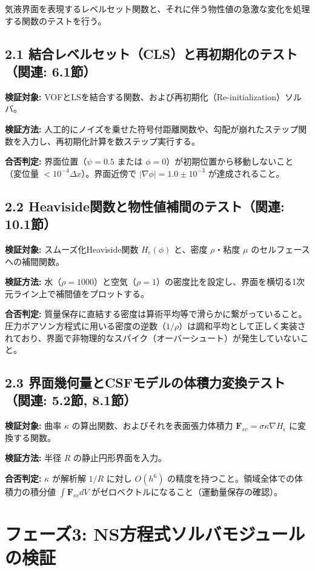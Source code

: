 \documentclass[12pt, a4paper, titlepage]{article}
\begin{document}
気液界面を表現するレベルセット関数と、それに伴う物性値の急激な変化を処理する関数のテストを行う。

\subsection*{2.1 結合レベルセット（CLS）と再初期化のテスト（関連: 6.1節）}

\textbf{検証対象:} VOFとLSを結合する関数、および再初期化（Re-initialization）ソルバ。

\textbf{検証方法:} 人工的にノイズを乗せた符号付距離関数や、勾配が崩れたステップ関数を入力し、再初期化計算を数ステップ実行する。

\textbf{合否判定:} 界面位置（$\psi=0.5$ または $\phi=0$）が初期位置から移動しないこと（変位量 $< 10^{-4}\Delta x$）。界面近傍で $|\nabla \phi| = 1.0 \pm 10^{-3}$ が達成されること。

\subsection*{2.2 Heaviside関数と物性値補間のテスト（関連: 10.1節）}

\textbf{検証対象:} スムーズ化Heaviside関数 $H_\epsilon(\phi)$ と、密度 $\rho$・粘度 $\mu$ のセルフェースへの補間関数。

\textbf{検証方法:} 水（$\rho=1000$）と空気（$\rho=1$）の密度比を設定し、界面を横切る1次元ライン上で補間値をプロットする。

\textbf{合否判定:} 質量保存に直結する密度は算術平均等で滑らかに繋がっていること。圧力ポアソン方程式に用いる密度の逆数（$1/\rho$）は調和平均として正しく実装されており、界面で非物理的なスパイク（オーバーシュート）が発生していないこと。

\subsection*{2.3 界面幾何量とCSFモデルの体積力変換テスト（関連: 5.2節, 8.1節）}

\textbf{検証対象:} 曲率 $\kappa$ の算出関数、およびそれを表面張力体積力 $\mathbf{F}_{sv} = \sigma \kappa \nabla H_\epsilon$ に変換する関数。

\textbf{検証方法:} 半径 $R$ の静止円形界面を入力。

\textbf{合否判定:} $\kappa$ が解析解 $1/R$ に対し $O(h^6)$ の精度を持つこと。領域全体での体積力の積分値 $\int \mathbf{F}_{sv} dV$ がゼロベクトルになること（運動量保存の確認）。

\section*{フェーズ3: NS方程式ソルバモジュールの検証}
\end{document}
